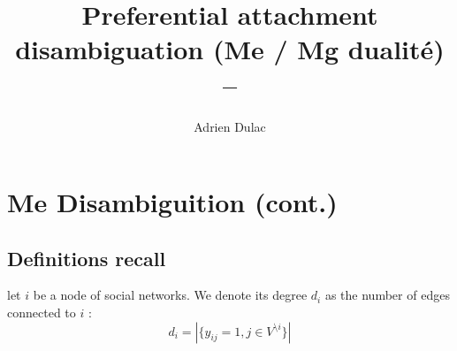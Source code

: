 \documentclass{article}
\title{ %
    \Large{Preferential attachment disambiguation (Me / Mg dualité)}\\--\\ }
\author{Adrien Dulac}
\begin{document}
\maketitle
%

\section{Me Disambiguition (cont.)}


%
%
%
%
%
%
\subsection{Definitions recall}

\begin{definition}
    let $i$ be a node of social networks. We denote its degree $d_i$ as the number of edges connected to $i$ : 
    \begin{equation}
        d_i = |\{y_{ij}=1, j \in V^{\setminus i}\}|
    \end{equation}
\end{definition}
\end{document}

